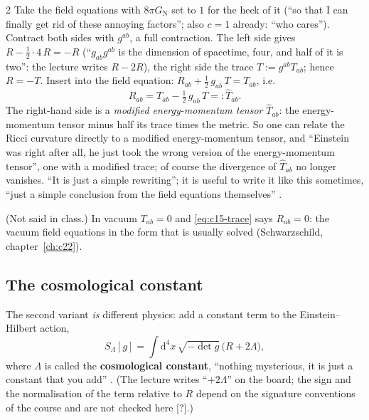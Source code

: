 \begin{paracol}{2}
Take the field equations with $8\pi G_{\mathrm N}$ set to $1$ for the heck of it (``so that I can finally get rid of these annoying factors''; also $c=1$ already: ``who cares''). Contract both sides with $g^{ab}$, a full contraction. The left side gives $R-\tfrac12\cdot4\,R=-R$ (``$g_{ab}g^{ab}$ is the dimension of spacetime, four, and half of it is two'': the lecture writes $R-2R$), the right side the trace $T:=g^{ab}T_{ab}$; hence $R=-T$. Insert into the field equation: $R_{ab}+\tfrac12\,g_{ab}\,T=T_{ab}$, i.e.
\begin{equation}\label{eq:c15-trace}
  R_{ab}=T_{ab}-\tfrac12\,g_{ab}\,T=:\hat T_{ab}.
\end{equation}
The right-hand side is a \emph{modified energy-momentum tensor} $\hat T_{ab}$: the energy-momentum tensor minus half its trace times the metric. So one can relate the Ricci curvature directly to a modified energy-momentum tensor, and ``Einstein was right after all, he just took the wrong version of the energy-momentum tensor'', one with a modified trace; of course the divergence of $\hat T_{ab}$ no longer vanishes. ``It is just a simple rewriting''; it is useful to write it like this sometimes, ``just a simple conclusion from the field equations themselves'' .
\begin{coursenote}[Vacuum]
(Not said in class.) In vacuum $T_{ab}=0$ and \eqref{eq:c15-trace} says $R_{ab}=0$: the vacuum field equations in the form that is usually solved (Schwarzschild, chapter~\ref{ch:c22}).
\end{coursenote}

\subsection{The cosmological constant}

The second variant \emph{is} different physics: add a constant term to the Einstein--Hilbert action,
\[
  S_\Lambda[g]=\int\mathrm d^4x\,\sqrt{-\det g}\,\bigl(R+2\Lambda\bigr),
\]
where $\Lambda$ is called the \textbf{cosmological constant}, ``nothing mysterious, it is just a constant that you add'' . (The lecture writes ``$+2\Lambda$'' on the board; the sign and the normalisation of the term relative to $R$ depend on the signature conventions of the course and are not checked here [?].)


\end{paracol}
